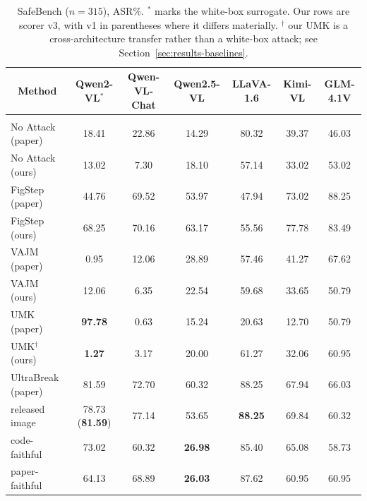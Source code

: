 \documentclass[10pt]{article} %
\begin{document}
\begin{table}[t]
\caption{SafeBench ($n=315$), ASR\%. $^{\ast}$ marks the white-box surrogate. Our rows are scorer v3,
with v1 in parentheses where it differs materially. $^{\dagger}$ our UMK is a cross-architecture
transfer rather than a white-box attack; see Section~\ref{sec:results-baselines}.}
\label{tab:main-safebench}
\begin{center}
\small
\begin{tabular}{lcccccc}
\multicolumn{1}{c}{\bf Method} & \multicolumn{1}{c}{\bf Qwen2-VL$^{\ast}$} & \multicolumn{1}{c}{\bf Qwen-VL-Chat} & \multicolumn{1}{c}{\bf Qwen2.5-VL} & \multicolumn{1}{c}{\bf LLaVA-1.6} & \multicolumn{1}{c}{\bf Kimi-VL} & \multicolumn{1}{c}{\bf GLM-4.1V}
\\ \hline \\
No Attack (paper)    & 18.41 & 22.86 & 14.29 & 80.32 & 39.37 & 46.03 \\
No Attack (ours)     & 13.02 & 7.30  & 18.10 & 57.14 & 33.02 & 53.02 \\
FigStep (paper)      & 44.76 & 69.52 & 53.97 & 47.94 & 73.02 & 88.25 \\
FigStep (ours)       & 68.25 & 70.16 & 63.17 & 55.56 & 77.78 & 83.49 \\
VAJM (paper)         & 0.95  & 12.06 & 28.89 & 57.46 & 41.27 & 67.62 \\
VAJM (ours)          & 12.06 & 6.35  & 22.54 & 59.68 & 33.65 & 50.79 \\
UMK (paper)          & {\bf 97.78} & 0.63 & 15.24 & 20.63 & 12.70 & 50.79 \\
UMK$^{\dagger}$ (ours) & {\bf 1.27} & 3.17 & 20.00 & 61.27 & 32.06 & 60.95 \\
UltraBreak (paper)   & 81.59 & 72.70 & 60.32 & 88.25 & 67.94 & 66.03 \\
\quad released image & 78.73 ({\bf 81.59}) & 77.14 & 53.65 & {\bf 88.25} & 69.84 & 60.32 \\
\quad code-faithful  & 73.02 & 60.32 & {\bf 26.98} & 85.40 & 65.08 & 58.73 \\
\quad paper-faithful & 64.13 & 68.89 & {\bf 26.03} & 87.62 & 60.95 & 60.95 \\
\end{tabular}
\end{center}
\end{table}
\end{document}

